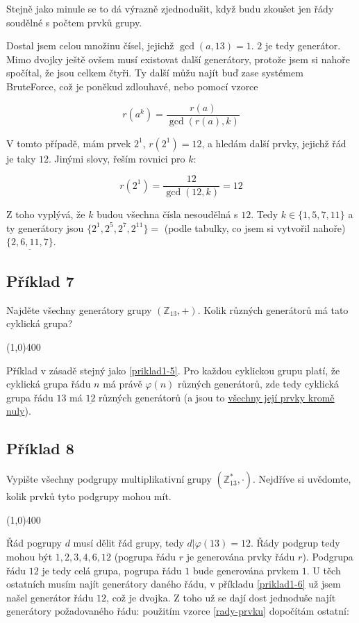 \documentclass{article}
\begin{document}
Stejně jako minule se to dá výrazně zjednodušit, když budu zkoušet jen řády soudělné s počtem prvků grupy.

Dostal jsem celou množinu čísel, jejichž $\gcd(a,13) = 1$. $2$ je tedy generátor. Mimo dvojky ještě ovšem musí existovat další generátory, protože jsem si nahoře spočítal, že jsou celkem čtyři. Ty další můžu najít buď zase systémem BruteForce\texttrademark, což je poněkud zdlouhavé, nebo pomocí vzorce

\begin{equation}
	r(a^k) = \frac{r(a)}{\gcd(r(a), k)}
	\label{rady-prvku}
\end{equation}

V tomto případě, mám prvek $2^1$, $r(2^1) = 12$, a hledám další prvky, jejichž řád je taky $12$. Jinými slovy, řeším rovnici pro $k$:

$$r(2^1) = \frac{12}{\gcd(12, k)} = 12$$

Z toho vyplývá, že $k$ budou všechna čísla nesoudělná s $12$. Tedy $k \in \{1, 5, 7, 11\}$ a ty generátory jsou $\{2^1, 2^5, 2^7, 2^{11}\} = $ (podle tabulky, co jsem si vytvořil nahoře) $\underline{\{2, 6, 11, 7\}}$.  

\subsection{Příklad 7}
Najděte všechny generátory grupy $(\mathbb{Z}_{13},+)$. Kolik různých generátorů má tato cyklická grupa?

\line(1,0){400}

Příklad v zásadě stejný jako \ref{priklad1-5}. Pro každou cyklickou grupu platí, že cyklická grupa řádu $n$ má právě $\varphi(n)$ různých generátorů, zde tedy cyklická grupa řádu $13$ má $\underline{12}$ různých generátorů (a jsou to \underline{všechny její prvky kromě nuly}).

\subsection{\label{priklad1-8}Příklad 8}
Vypište všechny podgrupy multiplikativní grupy $(\mathbb{Z}_{13}^{*},\cdot)$. Nejdříve si uvědomte, kolik prvků tyto podgrupy mohou mít.

\line(1,0){400}

Řád pogrupy $d$ musí dělit řád grupy, tedy $d | \varphi(13) = 12$. Řády podgrup tedy mohou být ${1,2,3,4,6,12}$ (pogrupa řádu $r$ je generována prvky řádu $r$). Podgrupa řádu $12$ je tedy celá grupa, pogrupa řádu $1$ bude generována prvkem $1$. U těch ostatních musím najít generátory daného řádu, v příkladu \ref{priklad1-6} už jsem našel generátor řádu $12$, což je dvojka. Z toho už se dají dost jednoduše najít generátory požadovaného řádu: použitím vzorce \ref{rady-prvku} dopočítám ostatní:
\end{document}
